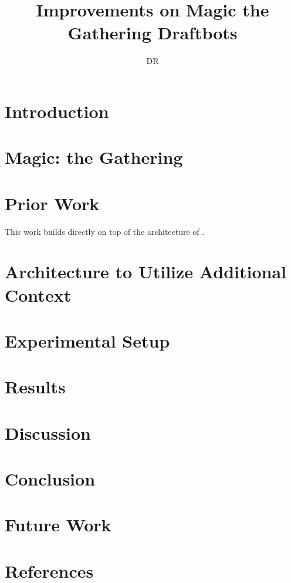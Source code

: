 \documentclass[twocolumn]{article}
\title{Improvements on Magic the Gathering Draftbots}
\author{DR}
\theoremstyle{definition}
\theoremstyle{plain}
\theoremstyle{remark}
\begin{document}
  \maketitle

  \begin{abstract}
  \end{abstract}

  \section{Introduction}

  \section{Magic: the Gathering}

  \section{Prior Work}

    This work builds directly on top of the architecture of \cite{DBLP:journals/corr/abs-2105-11864}.

  \section{Architecture to Utilize Additional Context}

    \begin{figure}[t!]
      \centering
      \caption[Architecture to embed a set of cards.]{}
    \end{figure}

  \section{Experimental Setup}

  \section{Results}

  \section{Discussion}

  \section{Conclusion}

  \section{Future Work}

  \section*{References}

    {}
    
\end{document}
